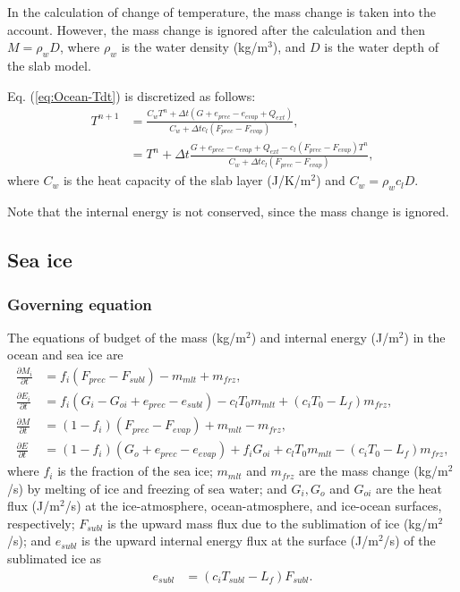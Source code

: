 In the calculation of change of temperature, the mass change is taken into the account.
However, the mass change is ignored after the calculation and then $M = \rho_w D$,
where
$\rho_w$ is the water density (kg/m$^3$),
and $D$ is the water depth of the slab model.

Eq. (\ref{eq:Ocean-Tdt}) is discretized as follows:
\begin{align}
  T^{n+1}
 &= \frac{ C_w T^n + \Delta t ( G + e_{prec} - e_{evap} + Q_{ext} ) }{ C_w + \Delta t c_l ( F_{prec} - F_{evap} ) }, \nonumber\\
 &= T^n + \Delta t \frac{ G + e_{prec} - e_{evap} + Q_{ext} - c_l ( F_{prec} - F_{evap} ) T^n }{ C_w + \Delta t c_l ( F_{prec} - F_{evap} ) },
\end{align}
where
$C_w$ is the heat capacity of the slab layer (J/K/m$^2$) and $C_w = \rho_w c_l D$.

Note that the internal energy is not conserved, since the mass change is ignored.


\subsection{Sea ice}
\subsubsection{Governing equation}
The equations of budget of the mass (kg/m$^2$) and internal energy (J/m$^2$) in the ocean and sea ice are
\begin{align}
 \frac{\partial M_i}{\partial t} &= f_i ( F_{prec}- F_{subl} ) - m_{mlt} + m_{frz}, \\
 \frac{\partial E_i}{\partial t} &= f_i ( G_i - G_{oi} + e_{prec} - e_{subl} ) - c_lT_0m_{mlt} + ( c_iT_0 - L_f ) m_{frz}, \\
 \frac{\partial M}{\partial t} &= (1-f_i) ( F_{prec} - F_{evap} ) + m_{mlt} - m_{frz}, \\
 \frac{\partial E}{\partial t} &= (1-f_i) ( G_o + e_{prec} - e_{evap} ) + f_i G_{oi} + c_lT_0m_{mlt} - ( c_iT_0 - L_f )m_{frz},
\end{align}
where
$f_i$ is the fraction of the sea ice;
$m_{mlt}$ and $m_{frz}$ are the mass change (kg/m$^2$/s) by melting of ice and freezing of sea water;
and $G_i, G_o$ and $G_{oi}$ are the heat flux (J/m$^2$/s) at the ice-atmosphere, ocean-atmosphere, and ice-ocean surfaces, respectively;
$F_{subl}$ is the upward mass flux due to the sublimation of ice (kg/m$^2$/s);
and $e_{subl}$ is the upward internal energy flux at the surface (J/m$^2$/s) of the sublimated ice as
\begin{align}
 e_{subl} &= (c_iT_{subl}-L_f)F_{subl}.
\end{align}

